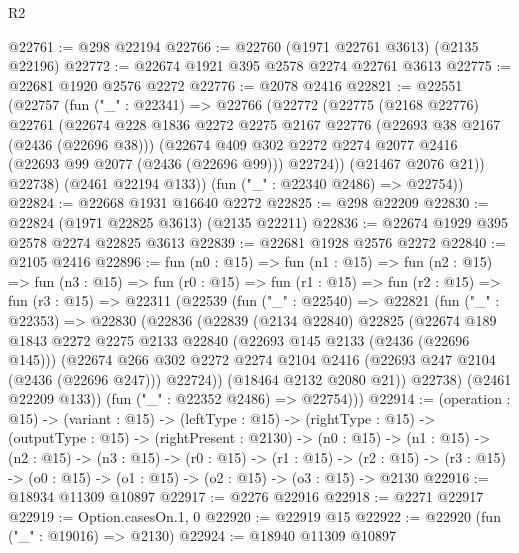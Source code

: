 \begin{lexlean}{R2}
\begin{coremodule}
@22761 := @298 @22194
@22766 := @22760 (@1971 @22761 @3613) (@2135 @22196)
@22772 := @22674 @1921 @395 @2578 @2274 @22761 @3613
@22775 := @22681 @1920 @2576 @2272
@22776 := @2078 @2416
@22821 := @22551
    (@22757
      (fun ("_" : @22341) =>
      @22766
        (@22772
          (@22775
            (@2168 @22776)
            @22761
            (@22674
              @228
              @1836
              @2272
              @2275
              @2167
              @22776
              (@22693 @38 @2167 (@2436 (@22696 @38)))
              (@22674
                @409
                @302
                @2272
                @2274
                @2077
                @2416
                (@22693 @99 @2077 (@2436 (@22696 @99)))
                @22724))
            (@21467 @2076 @21))
          @22738)
        (@2461 @22194 @133))
      (fun ("_" : @22340 @2486) => @22754))
@22824 := @22668 @1931 @16640 @2272
@22825 := @298 @22209
@22830 := @22824 (@1971 @22825 @3613) (@2135 @22211)
@22836 := @22674 @1929 @395 @2578 @2274 @22825 @3613
@22839 := @22681 @1928 @2576 @2272
@22840 := @2105 @2416
@22896 := fun (n0 : @15) =>
  fun (n1 : @15) =>
  fun (n2 : @15) =>
  fun (n3 : @15) =>
  fun (r0 : @15) =>
  fun (r1 : @15) =>
  fun (r2 : @15) =>
  fun (r3 : @15) =>
  @22311
    (@22539
      (fun ("_" : @22540) =>
      @22821
        (fun ("_" : @22353) =>
        @22830
          (@22836
            (@22839
              (@2134 @22840)
              @22825
              (@22674
                @189
                @1843
                @2272
                @2275
                @2133
                @22840
                (@22693 @145 @2133 (@2436 (@22696 @145)))
                (@22674
                  @266
                  @302
                  @2272
                  @2274
                  @2104
                  @2416
                  (@22693 @247 @2104 (@2436 (@22696 @247)))
                  @22724))
              (@18464 @2132 @2080 @21))
            @22738)
          (@2461 @22209 @133))
        (fun ("_" : @22352 @2486) => @22754)))
@22914 := (operation : @15) ->
  (variant : @15) ->
  (leftType : @15) ->
  (rightType : @15) ->
  (outputType : @15) ->
  (rightPresent : @2130) ->
  (n0 : @15) ->
  (n1 : @15) ->
  (n2 : @15) ->
  (n3 : @15) ->
  (r0 : @15) ->
  (r1 : @15) ->
  (r2 : @15) -> (r3 : @15) -> (o0 : @15) -> (o1 : @15) -> (o2 : @15) -> (o3 : @15) -> @2130
@22916 := @18934 @11309 @10897
@22917 := @2276 @22916
@22918 := @2271 @22917
@22919 := Option.casesOn.{1, 0}
@22920 := @22919 @15
@22922 := @22920 (fun ("_" : @19016) => @2130)
@22924 := @18940 @11309 @10897

\end{coremodule}
\end{lexlean}
